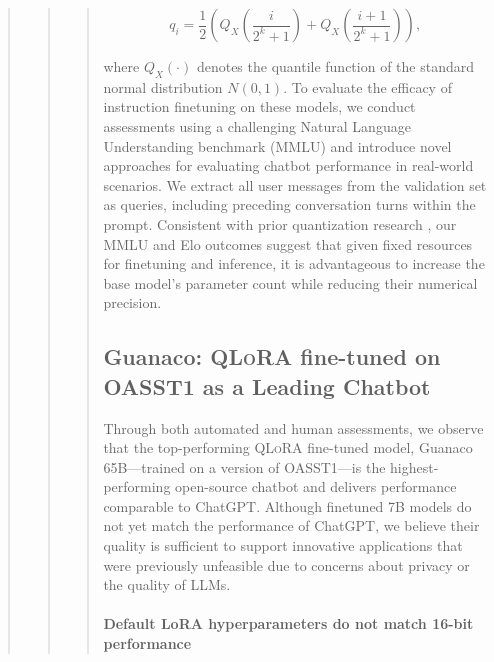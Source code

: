 \begin{quote}
\begin{abstract}
{{\begin{quote}
{\begin{equation}
q_i  = \frac{1}{2}\left( Q_X\left(\frac{i}{2^k+1}\right) + Q_X\left(\frac{i+1}{2^k+1}\right)\right),
\end{equation}

where $Q_X(\cdot)$ denotes the quantile function of the standard normal distribution $N(0,1)$. To evaluate the efficacy of instruction finetuning on these models, we conduct assessments using a challenging Natural Language Understanding benchmark (MMLU) and introduce novel approaches for evaluating chatbot performance in real-world scenarios. We extract all user messages from the validation set as queries, including preceding conversation turns within the prompt. Consistent with prior quantization research \citep{dettmers2022case}, our MMLU and Elo outcomes suggest that given fixed resources for finetuning and inference, it is advantageous to increase the base model's parameter count while reducing their numerical precision. \subsection{\textbf{Guanaco}: \textsc{QLoRA} fine-tuned on OASST1 as a Leading Chatbot} Through both automated and human assessments, we observe that the top-performing \textsc{QLoRA} fine-tuned model, {Guanaco} 65B—trained on a version of OASST1—is the highest-performing open-source chatbot and delivers performance comparable to ChatGPT. Although finetuned 7B models do not yet match the performance of ChatGPT, we believe their quality is sufficient to support innovative applications that were previously unfeasible due to concerns about privacy or the quality of LLMs. \paragraph{Default LoRA hyperparameters do not match 16-bit performance}

}
\end{quote}}}
\end{abstract}
\end{quote}
